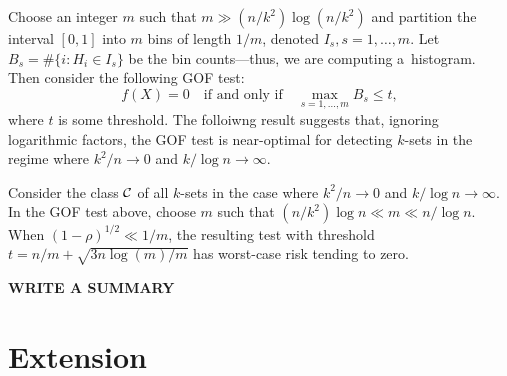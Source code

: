\documentclass[10pt, oneside]{article}
\begin{document}
Choose an integer $m$ such that $m \gg(n/k^2) \log(n/k^2)$ and partition
the interval $[0,1]$ into $m$ bins of length $1/m$, denoted $I_s,  s =
1,\ldots, m$. Let $B_s = \# \{i: H_i \in I_s\}$ be the bin
counts---thus, we are computing a~histogram. Then consider the
following GOF test:
%
\[
f(X)=0  \quad\mbox{if and only if}\quad
\max_{s = 1,\ldots, m} B_s \leq t,
\]
%
where $t$ is some threshold. The folloiwng result suggests that, ignoring logarithmic factors, the GOF test is near-optimal for detecting $k$-sets in
the regime where $k^2/n \to0$ and $k/\log n \to\infty$.

\begin{prop} \label{prpgof}
Consider the class ${\mathcal C}$ of all $k$-sets in the case where $k^2/n \to
0$ and $k/\log n \to\infty$. In the GOF test above, choose $m$ such
that $(n/k^2) \log n \ll m \ll n/\log n$. When $(1-\rho)^{1/2} \ll
1/m$, the resulting test with threshold $t = n/m + \sqrt{3 n \log(m)/m}$ has
worst-case risk tending to zero.
\end{prop}

{\bf WRITE A SUMMARY}

\section{Extension}



\end{document}
